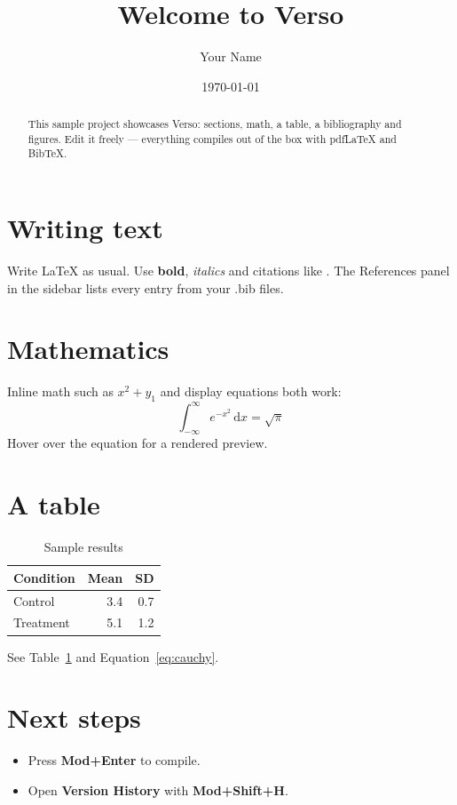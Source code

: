 \documentclass[11pt]{article}
\title{Welcome to Verso}
\author{Your Name}
\date{\today}
\begin{document}
\maketitle

\begin{abstract}
This sample project showcases Verso: sections, math, a table, a bibliography and
figures. Edit it freely --- everything compiles out of the box with pdfLaTeX and BibTeX.
\end{abstract}

\section{Writing text}
Write LaTeX as usual. Use \textbf{bold}, \textit{italics} and citations like
\cite{knuth1984}. The References panel in the sidebar lists every entry from your
.bib files.

\section{Mathematics}
Inline math such as $x^2 + y_1$ and display equations both work:
\begin{equation}
  \label{eq:cauchy}
  \int_{-\infty}^{\infty} e^{-x^2}\,\mathrm{d}x = \sqrt{\pi}
\end{equation}
Hover over the equation for a rendered preview.

\section{A table}
\begin{table}[ht]
  \centering
  \caption{Sample results}
  \label{tab:results}
  \begin{tabular}{lrr}
    \toprule
    Condition & Mean & SD \\
    \midrule
    Control & 3.4 & 0.7 \\
    Treatment & 5.1 & 1.2 \\
    \bottomrule
  \end{tabular}
\end{table}

See Table~\ref{tab:results} and Equation~\ref{eq:cauchy}.

\section{Next steps}
\begin{itemize}
  \item Press \textbf{Mod+Enter} to compile.
  \item Open \textbf{Version History} with \textbf{Mod+Shift+H}.
\end{itemize}

\printbibliography
\end{document}
